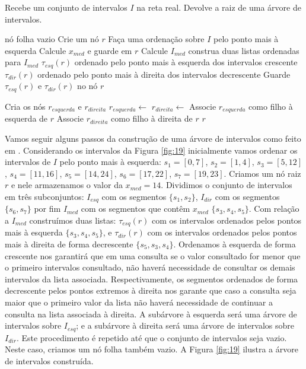 \begin{algorithm}[h!]
    \caption{Recebe um conjunto de intervalos $I$ na reta real. Devolve a raiz de uma árvore de intervalos.}
    \begin{algorithmic}[1]
                \Return nó folha vazio
            \Else
                \State Crie um nó $r$
                \State Faça uma ordenação sobre $I$ pelo ponto mais à esquerda
                \State Calcule $x_{med}$ e guarde em $r$ 
                \State Calcule $I_{med}$ construa duas listas ordenadas para $I_{med}$
                \State $\tau_{esq}(r)$ ordenado pelo ponto mais à esquerda dos intervalos crescente
                \State $\tau_{dir}(r)$ ordenado pelo ponto mais à direita dos intervalos decrescente
                \State Guarde $\tau_{esq}(r)$ e $\tau_{dir}(r)$ no nó $r$
                
                \State Cria os nós $r_{esquerda}$ e $r_{direita}$
                \State $r_{esquerda} \leftarrow $ 
                \State $r_{direita} \leftarrow $ 
                \State Associe $r_{esquerda}$ como filho à esquerda de $r$
                \State Associe $r_{direita}$ como filho à direita de $r$
                \State \Return $r$
            \EndIf
        \EndFunction
    \end{algorithmic}
\end{algorithm}


Vamos seguir alguns passos da construção de uma árvore de intervalos como feito em \cite{cgi1}. Considerando os intervalos da Figura \ref{fig:19} inicialmente vamos ordenar os intervalos de $I$ pelo ponto mais à esquerda: $s_1 = [0, 7]$, $s_2 = [1, 4]$, $s_3 = [5, 12]$, $s_4 = [11,16]$, $s_5 = [14, 24]$, $s_6 = [17, 22]$, $s_7 = [19, 23]$. Criamos um nó raiz $r$ e nele armazenamos o valor da $x_{med}  = 14$. Dividimos o conjunto de intervalos em três subconjuntos: $I_{esq}$ com os segmentos $\{s_1, s_2\}$, $I_{dir}$ com os segmentos $\{s_6, s_7\}$ por fim $I_{med}$ com os segmentos que contêm $x_{med}$ $\{ s_3, s_4, s_5\}$. Com relação a $I_{med}$ construímos duas listas: $\tau_{esq}(r)$ com os intervalos ordenados pelos pontos mais à esquerda $\{s_3,s_4,s_5\}$, e $\tau_{dir}(r)$ com os intervalos ordenados pelos pontos mais à direita de forma decrescente $\{s_5, s_3, s_4\}$. Ordenamos à esquerda de forma crescente nos garantirá que em uma consulta se o valor consultado for menor que o primeiro intervalos consultado, não haverá necessidade de consultar os demais intervalos da lista associada. Respectivamente, os segmentos ordenados de forma decrescente pelos pontos extremos à direita nos garante que caso a consulta seja maior que o primeiro valor da lista não haverá necessidade de continuar a consulta na lista associada à direita. A subárvore à esquerda será uma árvore de intervalos sobre $I_{esq}$; e a subárvore à direita será uma árvore de intervalos sobre $I_{dir}$. Este procedimento é repetido até que o conjunto de intervalos seja vazio. Neste caso, criamos um nó folha também vazio.
A Figura \ref{fig:19} ilustra a árvore de intervalos construída.

